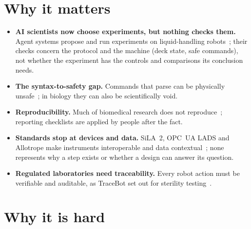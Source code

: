 \documentclass[10.5pt,a4paper]{article}
\begin{document}
\section{Why it matters}
\begin{itemize}
\item \textbf{AI scientists now choose experiments, but nothing checks them.} Agent systems propose and run
experiments on liquid-handling robots~\cite{verid}; their checks concern the protocol and the machine (deck state, safe
commands), not whether the experiment has the controls and comparisons its conclusion needs.
\item \textbf{The syntax-to-safety gap.} Commands that parse can be physically unsafe~\cite{safesdl}; in biology they
can also be scientifically void.
\item \textbf{Reproducibility.} Much of biomedical research does not reproduce~\cite{baker2016}; reporting checklists
are applied by people after the fact.
\item \textbf{Standards stop at devices and data.} SiLA~2, OPC~UA LADS and Allotrope make instruments interoperable and
data contextual~\cite{lapp}; none represents why a step exists or whether a design can answer its question.
\item \textbf{Regulated laboratories need traceability.} Every robot action must be verifiable and auditable, as
TraceBot set out for sterility testing~\cite{tracebot}.
\end{itemize}

\section{Why it is hard}
\end{document}
